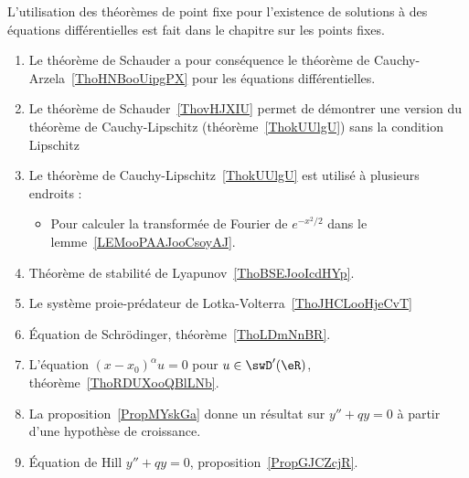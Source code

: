 
	\label{THEMEooEquaDiff}
L'utilisation des théorèmes de point fixe pour l'existence de solutions à des équations différentielles est fait dans le chapitre sur les points fixes.
\begin{enumerate}
	\item
	      Le théorème de Schauder a pour conséquence le théorème de Cauchy-Arzela~\ref{ThoHNBooUipgPX} pour les équations différentielles.
	\item
	      Le théorème de Schauder~\ref{ThovHJXIU} permet de démontrer une version du théorème de Cauchy-Lipschitz (théorème~\ref{ThokUUlgU}) sans la condition Lipschitz
	\item
	      Le théorème de Cauchy-Lipschitz~\ref{ThokUUlgU} est utilisé à plusieurs endroits :
	      \begin{itemize}
		      \item
		            Pour calculer la transformée de Fourier de \(  e^{-x^2/2}\) dans le lemme~\ref{LEMooPAAJooCsoyAJ}.
	      \end{itemize}
	\item
	      Théorème de stabilité de Lyapunov~\ref{ThoBSEJooIcdHYp}.
	\item
	      Le système proie-prédateur de Lotka-Volterra~\ref{ThoJHCLooHjeCvT}
	\item
	      Équation de Schrödinger, théorème~\ref{ThoLDmNnBR}.
	\item
	      L'équation \( (x-x_0)^{\alpha}u=0\) pour \( u\in\swD'(\eR)\), théorème~\ref{ThoRDUXooQBlLNb}.
	\item
	      La proposition~\ref{PropMYskGa} donne un résultat sur \( y''+qy=0\) à partir d'une hypothèse de croissance.
	\item
	      Équation de Hill \( y''+qy=0\), proposition~\ref{PropGJCZcjR}.
\end{enumerate}

